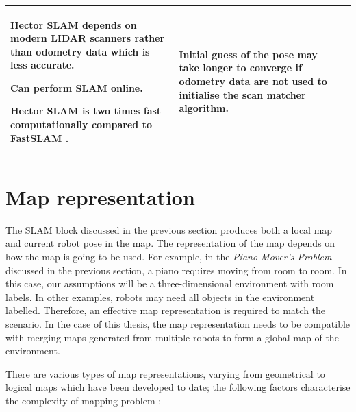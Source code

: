 \begin{table}[H]
\begin{tabular}{p{6.5em}p{5.5cm} p{5.5cm}}
\begin{compactitem}
{        \item Hector SLAM depends on modern LIDAR scanners rather than odometry data which is less accurate. 
        \item Can perform SLAM online.
        \item Hector SLAM is two times fast computationally compared to FastSLAM \cite{Eliwa2017}.}
    \end{compactitem}   &
    \begin{compactitem}{\small
       \item Initial guess of the pose may take longer to converge if odometry data are not used to initialise the scan matcher algorithm.} 
    \end{compactitem}\\
\bottomrule[1.5pt] 
\end{tabular}
\label{table:SLAM}
\end{table}

\section{Map representation}
The SLAM block discussed in the previous section produces both a local map and current robot pose in the map. The representation of the map depends on how the map is going to be used. For example, in the \textit{Piano Mover's Problem} discussed in the previous section, a piano requires moving from room to room. In this case, our assumptions will be a three-dimensional environment with room labels. In other examples, robots may need all objects in the environment labelled. Therefore, an effective map representation is required to match the scenario. In the case of this thesis, the map representation needs to be compatible with merging maps generated from multiple robots to form a global map of the environment. 

There are various types of map representations, varying from geometrical to logical maps which have been developed to date; the following factors characterise the complexity of mapping problem \cite{Thrun2006}:

